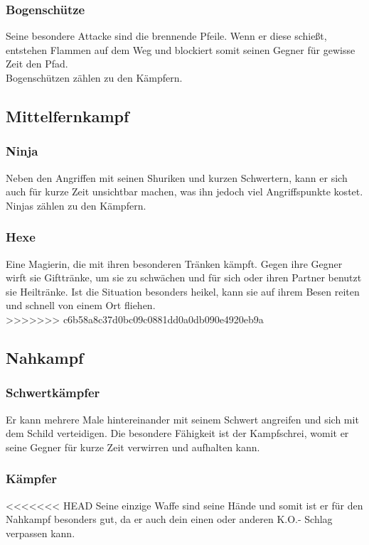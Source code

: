 \documentclass[10pt,a4paper,notitlepage]{report}
\begin{document}
\begin{flushleft}
\subsubsection{Bogenschütze}
Seine besondere Attacke sind die brennende Pfeile. Wenn er diese schießt, entstehen Flammen auf dem Weg und blockiert somit seinen Gegner für gewisse Zeit den Pfad.\\
Bogenschützen zählen zu den Kämpfern.\\
\subsection{Mittelfernkampf}
\subsubsection{Ninja}
Neben den Angriffen mit seinen Shuriken und kurzen Schwertern, kann er sich auch für kurze Zeit unsichtbar machen, was ihn jedoch viel Angriffspunkte kostet.\\
Ninjas zählen zu den Kämpfern.\\
\subsubsection{Hexe}
Eine Magierin, die mit ihren besonderen Tränken kämpft. Gegen ihre Gegner wirft sie Gifttränke, um sie zu schwächen und für sich oder ihren Partner benutzt sie Heiltränke. Ist die Situation besonders heikel, kann sie auf ihrem Besen reiten und schnell von einem Ort fliehen.\\
>>>>>>> c6b58a8c37d0bc09c0881dd0a0db090e4920eb9a
\subsection{Nahkampf}
\subsubsection{Schwertkämpfer}
Er kann mehrere Male hintereinander mit seinem Schwert angreifen und sich mit dem Schild verteidigen. Die besondere Fähigkeit ist der Kampfschrei, womit er seine Gegner für kurze Zeit verwirren und aufhalten kann.\\
\subsubsection{Kämpfer}
<<<<<<< HEAD
Seine einzige Waffe sind seine Hände und somit ist er für den Nahkampf besonders gut, da er auch dein einen oder anderen K.O.- Schlag verpassen kann.\\

\end{flushleft}
\end{document}
